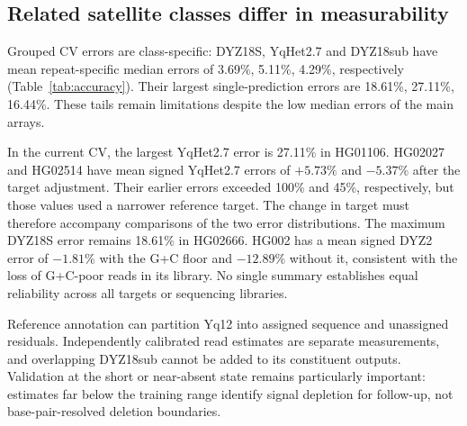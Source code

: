 \documentclass[pdflatex,sn-nature]{sn-jnl}
\begin{document}
\subsection{Related satellite classes differ in measurability}\label{sec:res-classes}
Grouped CV errors are class-specific: DYZ18S, YqHet2.7 and DYZ18sub have mean repeat-specific median errors of 3.69\%, 5.11\%, 4.29\%, respectively (Table~\ref{tab:accuracy}). Their largest single-prediction errors are 18.61\%, 27.11\%, 16.44\%. These tails remain limitations despite the low median errors of the main arrays.

In the current CV, the largest YqHet2.7 error is 27.11\% in HG01106. HG02027 and HG02514 have mean signed YqHet2.7 errors of $+5.73\%$ and $-5.37\%$ after the target adjustment. Their earlier errors exceeded 100\% and 45\%, respectively, but those values used a narrower reference target. The change in target must therefore accompany comparisons of the two error distributions. The maximum DYZ18S error remains 18.61\% in HG02666. HG002 has a mean signed DYZ2 error of $-1.81\%$ with the G+C floor and $-12.89\%$ without it, consistent with the loss of G+C-poor reads in its library. No single summary establishes equal reliability across all targets or sequencing libraries.

Reference annotation can partition Yq12 into assigned sequence and unassigned residuals. Independently calibrated read estimates are separate measurements, and overlapping DYZ18sub cannot be added to its constituent outputs. Validation at the short or near-absent state remains particularly important: estimates far below the training range identify signal depletion for follow-up, not base-pair-resolved deletion boundaries.
\end{document}
